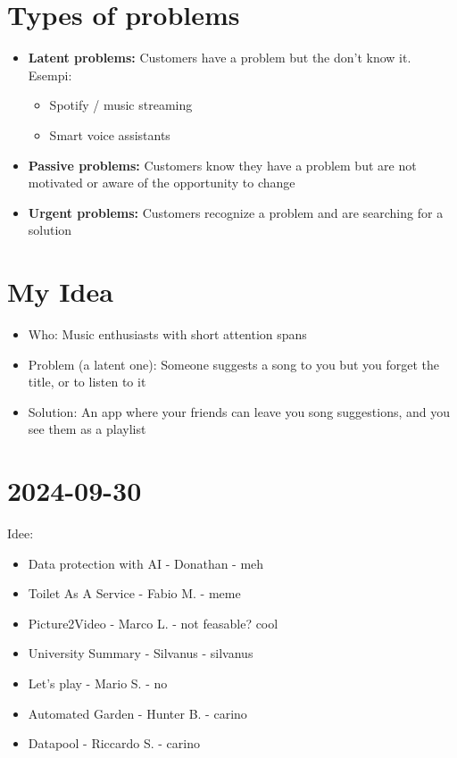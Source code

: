 \documentclass{article}
\begin{document}
\section{Types of problems}
\begin{itemize}
    \item \textbf{Latent problems:} Customers have a problem but the don't know it. \\
        Esempi: \begin{itemize}
            \item Spotify / music streaming
            \item Smart voice assistants
        \end{itemize}
    \item \textbf{Passive problems:} Customers know they have a problem but are not motivated or aware of the opportunity to change
    \item \textbf{Urgent problems:} Customers recognize a problem and are searching for a solution
\end{itemize}

\section{My Idea}
\begin{itemize}
    \item Who: Music enthusiasts with short attention spans
    \item Problem (a latent one): Someone suggests a song to you but you forget the title, or to listen to it
    \item Solution: An app where your friends can leave you song suggestions, and you see them as a playlist
\end{itemize}

\section{2024-09-30}
Idee:
\begin{itemize}
    \item Data protection with AI - Donathan - meh
    \item Toilet As A Service - Fabio M. - meme
    \item Picture2Video - Marco L. - not feasable? cool
    \item University Summary - Silvanus - silvanus
    \item Let's play - Mario S. - no
    \item Automated Garden - Hunter B. - carino
    \item Datapool -  Riccardo S. - carino
\end{itemize}
\end{document}
